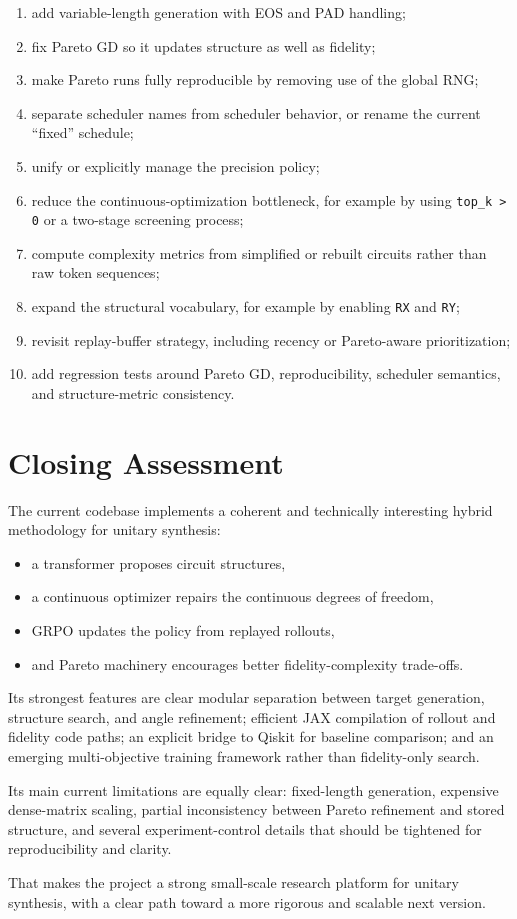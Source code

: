\documentclass[11pt]{article}
\begin{document}
\begin{enumerate}[leftmargin=*]
\item add variable-length generation with EOS and PAD handling;
\item fix Pareto GD so it updates structure as well as fidelity;
\item make Pareto runs fully reproducible by removing use of the global RNG;
\item separate scheduler names from scheduler behavior, or rename the current ``fixed'' schedule;
\item unify or explicitly manage the precision policy;
\item reduce the continuous-optimization bottleneck, for example by using \texttt{top\_k > 0} or a two-stage screening process;
\item compute complexity metrics from simplified or rebuilt circuits rather than raw token sequences;
\item expand the structural vocabulary, for example by enabling \texttt{RX} and \texttt{RY};
\item revisit replay-buffer strategy, including recency or Pareto-aware prioritization;
\item add regression tests around Pareto GD, reproducibility, scheduler semantics, and structure-metric consistency.
\end{enumerate}

\section{Closing Assessment}

The current codebase implements a coherent and technically interesting hybrid methodology for unitary synthesis:

\begin{itemize}[leftmargin=*]
\item a transformer proposes circuit structures,
\item a continuous optimizer repairs the continuous degrees of freedom,
\item GRPO updates the policy from replayed rollouts,
\item and Pareto machinery encourages better fidelity-complexity trade-offs.
\end{itemize}

Its strongest features are clear modular separation between target generation, structure search, and angle refinement; efficient JAX compilation of rollout and fidelity code paths; an explicit bridge to Qiskit for baseline comparison; and an emerging multi-objective training framework rather than fidelity-only search.

Its main current limitations are equally clear: fixed-length generation, expensive dense-matrix scaling, partial inconsistency between Pareto refinement and stored structure, and several experiment-control details that should be tightened for reproducibility and clarity.

That makes the project a strong small-scale research platform for unitary synthesis, with a clear path toward a more rigorous and scalable next version.
\end{document}
